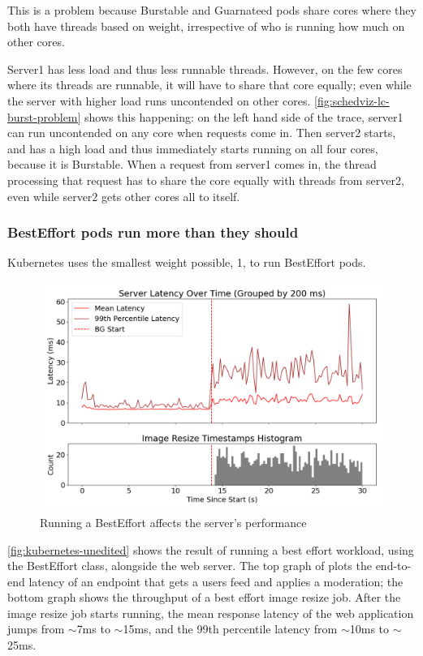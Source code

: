 This is a problem because Burstable and Guarnateed pods share cores where they
both have threads based on weight, irrespective of who is running how much on
other cores.

Server1 has less load and thus less runnable threads. However, on the few cores
where its threads are runnable, it will have to share that core equally; even
while the server with higher load runs uncontended on other cores.
\autoref{fig:schedviz-lc-burst-problem} shows this happening: on the left hand
side of the trace, server1 can run uncontended on any core when requests come
in. Then server2 starts, and has a high load and thus immediately starts running
on all four cores, because it is Burstable. When a request from server1 comes
in, the thread processing that request has to share the core equally with
threads from server2, even while server2 gets other cores all to itself.


\subsubsection{BestEffort pods run more than they should}

Kubernetes uses the smallest weight possible, 1, to run BestEffort pods. 

\begin{figure}[t]
    \centering
    \includegraphics[width=\columnwidth]{graphs/kubernetes-unedited.png}
    \caption{Running a BestEffort affects the server's
    performance}\label{fig:kubernetes-unedited}
\end{figure}

\autoref{fig:kubernetes-unedited} shows the result of running a best effort
workload, using the BestEffort class, alongside the web server. The top graph of
plots the end-to-end latency of an endpoint that gets a users feed and applies a
moderation; the bottom graph shows the throughput of a best effort image resize
job. After the image resize job starts running, the mean response latency of the
web application jumps from $\sim$7ms to $\sim$15ms, and the 99th percentile
latency from $\sim$10ms to $\sim$25ms.


